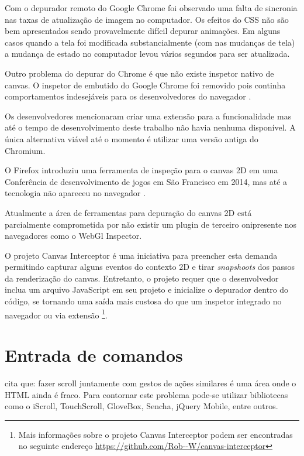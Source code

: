Com o depurador remoto do Google Chrome foi observado uma falta de
sincronia nas taxas de atualização de imagem no computador. Os
efeitos do CSS não são bem apresentados sendo provavelmente difícil
depurar animações. Em alguns casos quando a tela foi modificada
substancialmente (com nas mudanças de tela) a mudança de estado no
computador levou vários segundos para ser atualizada.

Outro problema do depurar do Chrome é que não existe inspetor nativo
de canvas. O inspetor de embutido do Google Chrome foi removido pois
continha comportamentos indesejáveis para os desenvolvedores do
navegador \autocite{canvasinspector}.

Os desenvolvedores mencionaram criar uma extensão para a funcionalidade
mas até o tempo de desenvolvimento deste trabalho não havia nenhuma
disponível. A única alternativa viável até o momento é utilizar uma
versão antiga do Chromium.

O Firefox introduziu uma ferramenta de inspeção para o canvas 2D
em uma Conferência de desenvolvimento de jogos em São Francisco em 2014,
mas até a tecnologia não apareceu no navegador \autocite{firefoxCanvasDebug}.

Atualmente a área de ferramentas para depuração do canvas 2D está
parcialmente comprometida por não existir um plugin de terceiro
onipresente nos navegadores como o WebGl Inspector.

O projeto Canvas Interceptor é uma iniciativa para preencher
esta demanda permitindo capturar alguns eventos do contexto 2D e
tirar \textit{snapshoots} dos passos da renderização do canvas.
Entretanto, o projeto requer que o desenvolvedor inclua um arquivo
JavaScript em seu projeto e inicialize o depurador dentro do código,
se tornando uma saída mais custosa do que um inspetor integrado
no navegador ou via extensão \footnote{Mais informações sobre o
projeto Canvas Interceptor podem ser encontradas no seguinte endereço
\url{https://github.com/Rob--W/canvas-interceptor}}.

\section{Entrada de comandos}

\autocite[pp. 9]{aSeriousContender} cita que: fazer scroll juntamente
com gestos de ações similares é uma área onde o HTML ainda é
fraco. Para contornar este problema pode-se utilizar bibliotecas como o
iScroll, TouchScroll, GloveBox, Sencha, jQuery Mobile, entre outros.

